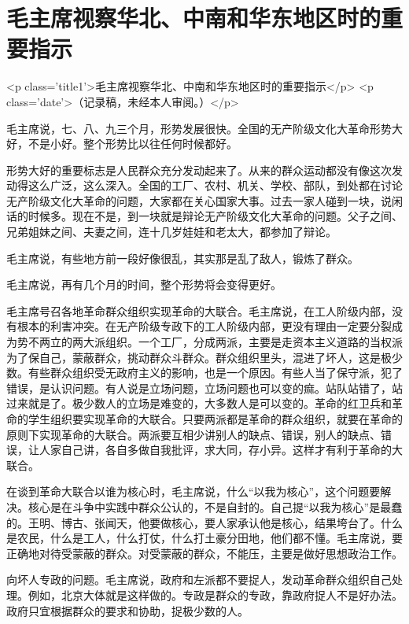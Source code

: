 \section[毛主席视察华北、中南和华东地区时的重要指示 ]{毛主席视察华北、中南和华东地区时的重要指示 }



<p class='title1'>毛主席视察华北、中南和华东地区时的重要指示</p>
<p class='date'>（记录稿，未经本人审阅。）</p>


毛主席说，七、八、九三个月，形势发展很快。全国的无产阶级文化大革命形势大好，不是小好。整个形势比以往任何时候都好。

形势大好的重要标志是人民群众充分发动起来了。从来的群众运动都没有像这次发动得这么广泛，这么深入。全国的工厂、农村、机关、学校、部队，到处都在讨论无产阶级文化大革命的问题，大家都在关心国家大事。过去一家人碰到一块，说闲话的时候多。现在不是，到一块就是辩论无产阶级文化大革命的问题。父子之间、兄弟姐妹之间、夫妻之间，连十几岁娃娃和老太大，都参加了辩论。

毛主席说，有些地方前一段好像很乱，其实那是乱了敌人，锻炼了群众。

毛主席说，再有几个月的时间，整个形势将会变得更好。

毛主席号召各地革命群众组织实现革命的大联合。毛主席说，在工人阶级内部，没有根本的利害冲突。在无产阶级专政下的工人阶级内部，更没有理由一定要分裂成为势不两立的两大派组织。一个工厂，分成两派，主要是走资本主义道路的当权派为了保自己，蒙蔽群众，挑动群众斗群众。群众组织里头，混进了坏人，这是极少数。有些群众组织受无政府主义的影响，也是一个原因。有些人当了保守派，犯了错误，是认识问题。有人说是立场问题，立场问题也可以变的痲。站队站错了，站过来就是了。极少数人的立场是难变的，大多数人是可以变的。革命的红卫兵和革命的学生组织要实现革命的大联合。只要两派都是革命的群众组织，就要在革命的原则下实现革命的大联合。两派要互相少讲别人的缺点、错误，别人的缺点、错误，让人家自己讲，各自多做自我批评，求大同，存小异。这样才有利于革命的大联合。

在谈到革命大联合以谁为核心时，毛主席说，什么“以我为核心”，这个问题要解决。核心是在斗争中实践中群众公认的，不是自封的。自己提“以我为核心”是最蠢的。王明、博古、张闻天，他要做核心，要人家承认他是核心，结果垮台了。什么是农民，什么是工人，什么打仗，什么打土豪分田地，他们都不懂。毛主席说，要正确地对待受蒙蔽的群众。对受蒙蔽的群众，不能压，主要是做好思想政治工作。

向坏人专政的问题。毛主席说，政府和左派都不要捉人，发动革命群众组织自己处理。例如，北京大体就是这样做的。专政是群众的专政，靠政府捉人不是好办法。政府只宜根据群众的要求和协助，捉极少数的人。

